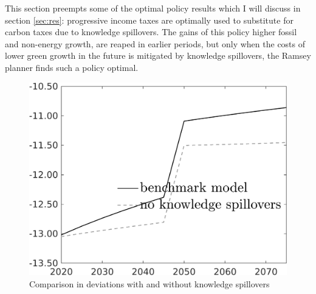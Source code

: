 This section preempts some of the optimal policy results which I will discuss in section \ref{sec:res}: progressive income taxes are optimally used to substitute for carbon taxes due to knowledge spillovers. The gains of this policy higher fossil and non-energy growth, are reaped in earlier periods, but only when the costs of lower green growth in the future is mitigated by knowledge spillovers, the Ramsey planner finds such a policy optimal. 
 \begin{figure}[h!!]
	\centering
	\caption{Comparison in deviations with and without knowledge spillovers  }\label{fig:Limit_nsk0_xgr0_know_Devs}		
	\begin{minipage}[]{0.32\textwidth}
		\includegraphics[width=1\textwidth]{../../codding_model/own_basedOnFried/optimalPol_010922_revision/figures/all_13Sept22/CompTaufPER_bytaul_KN_Reg0_GFF_spillover0_nsk0_xgr0_knspil0_sep0_LFlimit1_emsbase0_countec0_GovRev0_etaa0.79_lgd1.png}
	 \end{minipage}	
	\begin{minipage}[]{0.32\textwidth}

\end{minipage}
\end{figure}

